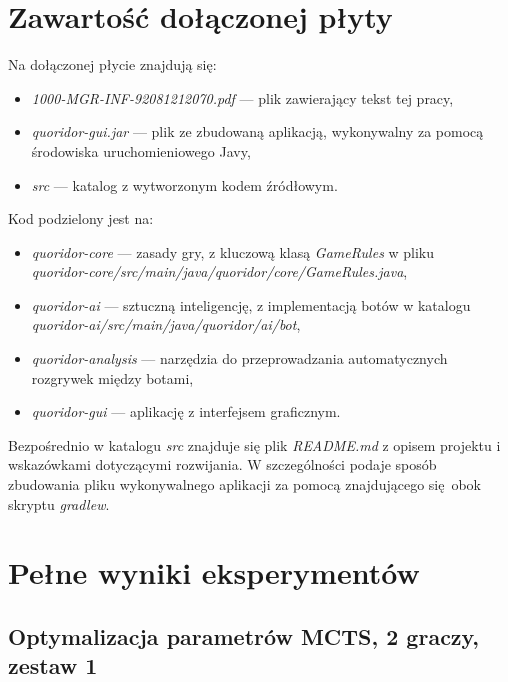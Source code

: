 \documentclass{pracamgr}
\begin{document}
\begin{appendices}

    \chapter{Zawartość dołączonej płyty \label{code}}

    Na dołączonej płycie znajdują się:
\begin{itemize}
    \item \textit{1000-MGR-INF-92081212070.pdf} --- plik zawierający tekst tej pracy,
    \item \textit{quoridor-gui.jar} --- plik ze zbudowaną aplikacją, wykonywalny za pomocą środowiska uruchomieniowego Javy,
    \item \textit{src} --- katalog z wytworzonym kodem źródłowym.
\end{itemize}

Kod podzielony jest na:

\begin{itemize}
    \item \textit{quoridor-core} --- zasady gry, z kluczową klasą \textit{GameRules} w pliku \\ \textit{quoridor-core/src/main/java/quoridor/core/GameRules.java},
    \item \textit{quoridor-ai} --- sztuczną inteligencję, z implementacją botów w katalogu \\ \textit{quoridor-ai/src/main/java/quoridor/ai/bot},
    \item \textit{quoridor-analysis} --- narzędzia do przeprowadzania automatycznych rozgrywek między botami,
    \item \textit{quoridor-gui} --- aplikację z interfejsem graficznym.
\end{itemize}

    Bezpośrednio w katalogu \textit{src} znajduje się plik \textit{README.md} z opisem projektu i wskazówkami dotyczącymi rozwijania.
    W szczególności podaje sposób zbudowania pliku wykonywalnego aplikacji za pomocą znajdującego się obok skryptu \textit{gradlew}.

\chapter{Pełne wyniki eksperymentów}

\section{Optymalizacja parametrów MCTS, 2 graczy, zestaw 1\label{results-1-2p}}


\end{appendices}
\end{document}
